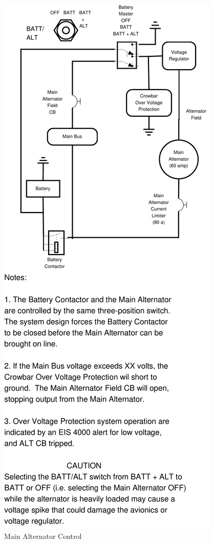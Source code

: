 \begin{figure}
\centering 
\includegraphics[scale=0.4]{../Diagrams/Alternator_large_note_narrow} \caption{Main Alternator Control} 
\end{figure}

